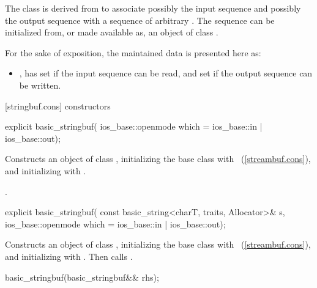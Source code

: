 \pnum
The class
is derived from
to associate possibly the input sequence and possibly
the output sequence with a sequence of arbitrary
.
The sequence can be initialized from, or made available as, an object of class
.

\pnum
For the sake of exposition, the maintained data is presented here as:
\begin{itemize}
\item
{},
has
set if the input sequence can be read, and
set if the output sequence can be written.
\end{itemize}

[stringbuf.cons]{  constructors}

%
\begin{itemdecl}
explicit basic_stringbuf(
  ios_base::openmode which = ios_base::in | ios_base::out);
\end{itemdecl}

\begin{itemdescr}
\pnum
\effects
Constructs an object of class
,
initializing the base class with
~(\ref{streambuf.cons}), and initializing
with .

\pnum
\postcondition
{}.
\end{itemdescr}

%
\begin{itemdecl}
explicit basic_stringbuf(
  const basic_string<charT, traits, Allocator>& s,
  ios_base::openmode which = ios_base::in | ios_base::out);
\end{itemdecl}

\begin{itemdescr}
\pnum
\effects
Constructs an object of class
,
initializing the base class with
~(\ref{streambuf.cons}), and initializing
with .
Then calls .
\end{itemdescr}

%
\begin{itemdecl}
basic_stringbuf(basic_stringbuf&& rhs);
\end{itemdecl}

